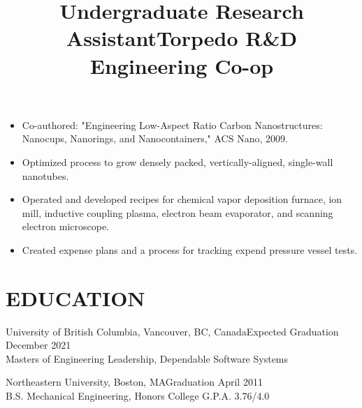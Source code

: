 \documentclass[line]{res}
\begin{document}
\begin{resume}
\title{Undergraduate Research Assistant}
\begin {position}
\vspace {-10 pt}
\begin{itemize}
\item Co-authored: "Engineering Low-Aspect Ratio Carbon Nanostructures: Nanocups, Nanorings, and Nanocontainers," ACS Nano, 2009.
\item Optimized process to grow densely packed, vertically-aligned, single-wall nanotubes.
\item Operated and developed recipes for chemical vapor deposition furnace, ion mill, inductive coupling plasma, electron beam evaporator, and scanning electron microscope.
\end{itemize}
\end{position}

\title{Torpedo R\&D Engineering Co-op}
\begin {position}
\vspace {-10 pt}
\begin{itemize}
\item Created expense plans and a process for tracking expend
    pressure vessel tests.
\end{itemize}
\end{position}

\section{EDUCATION}
\vspace {2 pt}

University of British Columbia, Vancouver, BC, Canada\hfill Expected Graduation December 2021\\
Masters of Engineering Leadership, Dependable Software Systems \

Northeastern University, Boston, MA\hfill Graduation April 2011 \\
B.S. Mechanical Engineering, Honors College \hfill G.P.A. 3.76/4.0 \

\end{resume}
\end{document}
